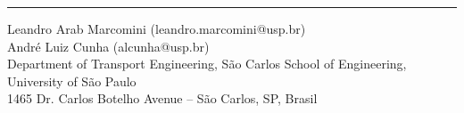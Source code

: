 \documentclass[article,12pt,a4paper,oneside,hidelinks]{memoir}
\begin{document}


\begin{minipage}[]{\linewidth}
	\footnotesize
	\setlength{\parskip}{0pt}
	\noindent\rule[1pt]{\linewidth}{1pt}
	Leandro Arab Marcomini (leandro.marcomini@usp.br) \\
	André Luiz Cunha (alcunha@usp.br) \\
	Department of Transport Engineering, São Carlos School of Engineering, University of São Paulo\\
	1465 Dr. Carlos Botelho Avenue – São Carlos, SP, Brasil \\
\end{minipage}
\end{document}
